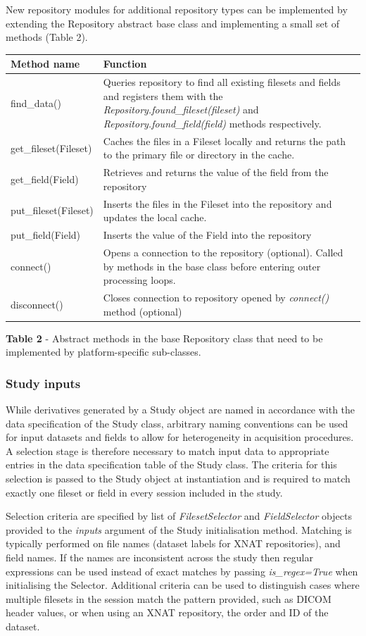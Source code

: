 New repository modules for additional repository types can be
implemented by extending the Repository abstract base class and
implementing a small set of methods (Table 2).

\begin{longtable}[]{@{}ll@{}}
\toprule
\textbf{Method name} & \textbf{Function}\tabularnewline
\midrule
\endhead
find\_data() & Queries repository to find all existing filesets and
fields and registers them with the
\emph{Repository.found\_fileset(fileset)} and
\emph{Repository.found\_field(field)} methods
respectively.\tabularnewline
get\_fileset(Fileset) & Caches the files in a Fileset locally and
returns the path to the primary file or directory in the
cache.\tabularnewline
get\_field(Field) & Retrieves and returns the value of the field from
the repository\tabularnewline
put\_fileset(Fileset) & Inserts the files in the Fileset into the
repository and updates the local cache.\tabularnewline
put\_field(Field) & Inserts the value of the Field into the
repository\tabularnewline
connect() & Opens a connection to the repository (optional). Called by
methods in the base class before entering outer processing
loops.\tabularnewline
disconnect() & Closes connection to repository opened by
\emph{connect()} method (optional)\tabularnewline
\bottomrule
\end{longtable}

\textbf{Table 2} - Abstract methods in the base Repository class that
need to be implemented by platform-specific sub-classes.

\subsubsection{Study inputs}
\label{study-inputs}

While derivatives generated by a Study object are named in accordance
with the data specification of the Study class, arbitrary naming
conventions can be used for input datasets and fields to allow for
heterogeneity in acquisition procedures. A selection stage is therefore
necessary to match input data to appropriate entries in the data
specification table of the Study class. The criteria for this selection
is passed to the Study object at instantiation and is required to match
exactly one fileset or field in every session included in the study.

Selection criteria are specified by list of \emph{FilesetSelector} and
\emph{FieldSelector} objects provided to the \emph{inputs} argument of
the Study initialisation method. Matching is typically performed on file
names (dataset labels for XNAT repositories), and field names. If the
names are inconsistent across the study then regular expressions can be
used instead of exact matches by passing \emph{is\_regex=True} when
initialising the Selector. Additional criteria can be used to
distinguish cases where multiple filesets in the session match the
pattern provided, such as DICOM header values, or when using an XNAT
repository, the order and ID of the dataset.

